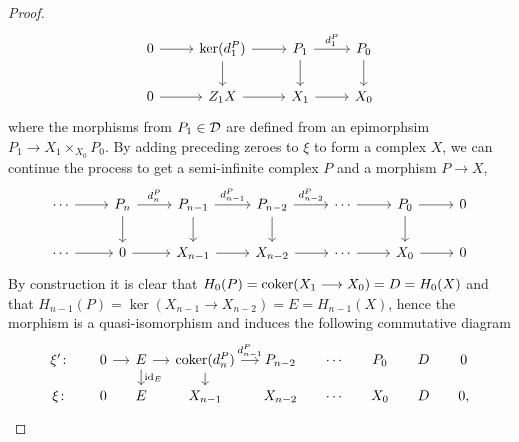 \begin{proof}
        \[\begin{tikzcd}
            0 & {\ker(d^P_1)} & {P_1} & {P_0} \\
            0 & {Z_1X} & {X_1} & {X_0}
            \arrow[from=1-1, to=1-2]
            \arrow[from=1-2, to=1-3]
            \arrow[from=1-2, to=2-2]
            \arrow["{{d_1^P}}", from=1-3, to=1-4]
            \arrow[from=1-3, to=2-3]
            \arrow[from=1-4, to=2-4]
            \arrow[from=2-1, to=2-2]
            \arrow[from=2-2, to=2-3]
            \arrow[from=2-3, to=2-4]
        \end{tikzcd}\]
        where the morphisms from $P_1 \in \mathcal{D}$ are defined from an epimorphsim $P_1 \longrightarrow X_1 \times_{X_0} P_0$. By adding preceding zeroes to $\xi$ to form a complex $X$, we can continue the process to get a semi-infinite complex $P$ and a morphism $P \longrightarrow X$,
        \[\begin{tikzcd}
            \cdots & {P_n} & {P_{n-1}} & {P_{n-2}} & \cdots & {P_0} & 0 \\
            \cdots & 0 & {X_{n-1}} & {X_{n-2}} & \cdots & {X_0} & 0
            \arrow[from=1-1, to=1-2]
            \arrow["{{d_n^P}}", from=1-2, to=1-3]
            \arrow[from=1-2, to=2-2]
            \arrow["{{d_{n-1}^P}}", from=1-3, to=1-4]
            \arrow[from=1-3, to=2-3]
            \arrow["{{d_{n-2}^P}}", from=1-4, to=1-5]
            \arrow[from=1-4, to=2-4]
            \arrow[from=1-5, to=1-6]
            \arrow[from=1-6, to=1-7]
            \arrow[from=1-6, to=2-6]
            \arrow[from=2-1, to=2-2]
            \arrow[from=2-2, to=2-3]
            \arrow[from=2-3, to=2-4]
            \arrow[from=2-4, to=2-5]
            \arrow[from=2-5, to=2-6]
            \arrow[from=2-6, to=2-7]
        \end{tikzcd}\]
        By construction it is clear that $H_0(P) = \operatorname{coker}(X_1 \longrightarrow X_0) = D = H_0(X)$ and that $H_{n-1}(P) = \ker(X_{n-1} \longrightarrow X_{n-2}) = E = H_{n-1}(X)$, hence the morphism is a quasi-isomorphism and induces the following commutative diagram 
        \[\begin{tikzcd}[sep=small]
            {\xi'\colon} & 0 & E & {\coker(d^P_n)} & {P_{n-2}} & \cdots & {P_0} & D & 0 \\
            {\xi\colon} & 0 & E & {X_{n-1}} & {X_{n-2}} & \cdots & {X_0} & D & {0,}
            \arrow[from=1-2, to=1-3]
            \arrow[from=1-3, to=1-4]
            \arrow["{{\id_E}}", from=1-3, to=2-3]
            \arrow["{{{d_{n-1}^P}}}", from=1-4, to=1-5]
            \arrow[from=1-4, to=2-4]

\end{tikzcd}\]
\end{proof}
